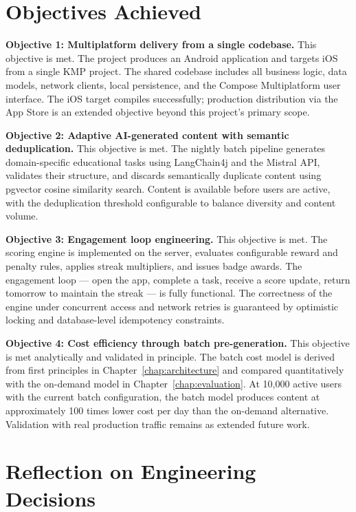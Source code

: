 \section{Objectives Achieved}

\textbf{Objective 1: Multiplatform delivery from a single codebase.} This objective is met. The project produces an Android application and targets iOS from a single KMP project. The shared codebase includes all business logic, data models, network clients, local persistence, and the Compose Multiplatform user interface. The iOS target compiles successfully; production distribution via the App Store is an extended objective beyond this project's primary scope.

\textbf{Objective 2: Adaptive AI-generated content with semantic deduplication.} This objective is met. The nightly batch pipeline generates domain-specific educational tasks using LangChain4j and the Mistral API, validates their structure, and discards semantically duplicate content using pgvector cosine similarity search. Content is available before users are active, with the deduplication threshold configurable to balance diversity and content volume.

\textbf{Objective 3: Engagement loop engineering.} This objective is met. The scoring engine is implemented on the server, evaluates configurable reward and penalty rules, applies streak multipliers, and issues badge awards. The engagement loop --- open the app, complete a task, receive a score update, return tomorrow to maintain the streak --- is fully functional. The correctness of the engine under concurrent access and network retries is guaranteed by optimistic locking and database-level idempotency constraints.

\textbf{Objective 4: Cost efficiency through batch pre-generation.} This objective is met analytically and validated in principle. The batch cost model is derived from first principles in Chapter~\ref{chap:architecture} and compared quantitatively with the on-demand model in Chapter~\ref{chap:evaluation}. At 10,000 active users with the current batch configuration, the batch model produces content at approximately 100 times lower cost per day than the on-demand alternative. Validation with real production traffic remains as extended future work.

\section{Reflection on Engineering Decisions}

